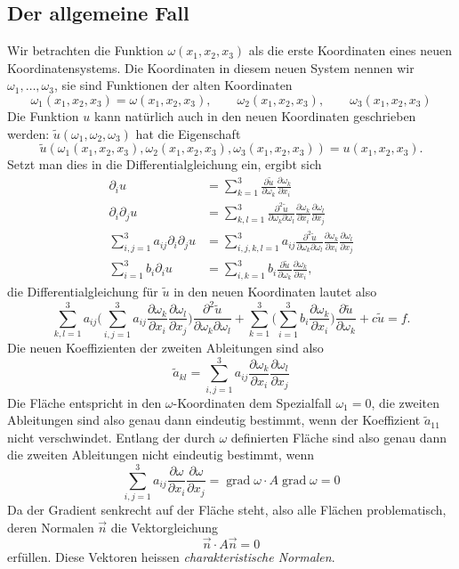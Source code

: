 \subsection{Der allgemeine Fall}
Wir betrachten die Funktion $\omega(x_1,x_2,x_3)$ als die erste
Koordinaten eines neuen Koordinatensystems. Die Koordinaten in diesem
neuen System nennen wir $\omega_1,\dots,\omega_3$, sie sind Funktionen
der alten Koordinaten
\[
\omega_1(x_1,x_2,x_3)=\omega(x_1,x_2,x_3)
,\qquad
\omega_2(x_1,x_2,x_3)
,\qquad
\omega_3(x_1,x_2,x_3)
\]
Die Funktion $u$ kann natürlich auch in den neuen Koordinaten geschrieben
werden: $\tilde u(\omega_1,\omega_2,\omega_3)$ hat die Eigenschaft
\[
\tilde u(
\omega_1(x_1,x_2,x_3),
\omega_2(x_1,x_2,x_3),
\omega_3(x_1,x_2,x_3)) = u(x_1,x_2,x_3).
\]
Setzt man dies in die Differentialgleichung ein, ergibt sich
\begin{align*}
\partial_iu
&=
\sum_{k=1}^3
\frac{\partial\tilde u}{\partial \omega_k}
\frac{\partial\omega_k}{\partial x_i}
\\
\partial_i\partial_ju
&=
\sum_{k,l=1}^3
\frac{\partial^2\tilde u}{\partial \omega_k\partial\omega_l}
\frac{\partial\omega_k}{\partial x_i}
\frac{\partial\omega_l}{\partial x_j}
\\
\sum_{i,j=1}^3a_{ij}\partial_i\partial_ju
&=
\sum_{i,j,k,l=1}^3a_{ij}
\frac{\partial^2\tilde u}{\partial \omega_k\partial\omega_l}
\frac{\partial\omega_k}{\partial x_i}
\frac{\partial\omega_l}{\partial x_j}
\\
\sum_{i=1}^3b_i\partial_iu
&=
\sum_{i,k=1}^3b_i
\frac{\partial\tilde u}{\partial \omega_k}
\frac{\partial\omega_k}{\partial x_i},
\end{align*}
die Differentialgleichung für $\tilde u$ in den neuen 
Koordinaten lautet also
\[
\sum_{k,l=1}^3a_{ij}
\biggl(
\sum_{i,j=1}^3a_{ij}
\frac{\partial\omega_k}{\partial x_i}
\frac{\partial\omega_l}{\partial x_j}
\biggr)
\frac{\partial^2\tilde u}{\partial \omega_k\partial\omega_l}
+
\sum_{k=1}^3
\biggl(
\sum_{i=1}^3
b_i
\frac{\partial\omega_k}{\partial x_i}
\biggr)
\frac{\partial\tilde u}{\partial \omega_k}
+c\tilde u
=f.
\]
Die neuen Koeffizienten der zweiten Ableitungen sind also
\[
\tilde a_{kl}=
\sum_{i,j=1}^3a_{ij}
\frac{\partial\omega_k}{\partial x_i}
\frac{\partial\omega_l}{\partial x_j}
\]
Die Fläche entspricht in den $\omega$-Koordinaten dem Spezialfall $\omega_1=0$,
die zweiten Ableitungen sind also genau dann eindeutig bestimmt, wenn
der Koeffizient $\tilde a_{11}$ nicht verschwindet. Entlang der durch $\omega$
definierten Fläche sind also genau dann die zweiten Ableitungen nicht eindeutig
bestimmt, wenn 
\[
\sum_{i,j=1}^3
a_{ij}
\frac{\partial\omega}{\partial x_i}
\frac{\partial\omega}{\partial x_j}
=
\operatorname{grad}\omega
\cdot
A
\operatorname{grad}\omega
=0
\]
Da der Gradient senkrecht auf der Fläche steht, also alle Flächen
problematisch, deren Normalen $\vec n$ die Vektorgleichung
\[
\vec n\cdot A\vec n=0
\]
erfüllen. Diese Vektoren heissen {\em charakteristische Normalen}.


